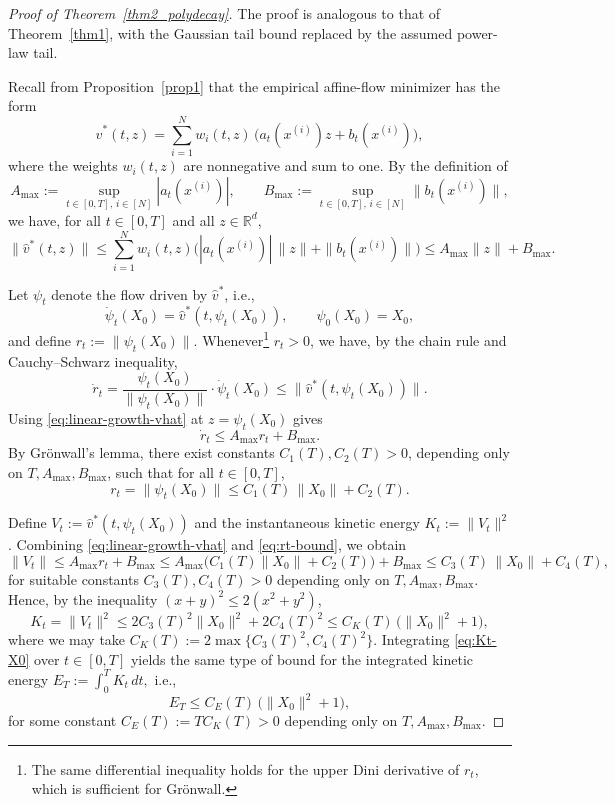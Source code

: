 \documentclass[a4paper,11pt]{article}
\theoremstyle{plain}
\theoremstyle{definition}
\begin{document}
\begin{proof}[Proof of Theorem~\ref{thm2_polydecay}]
The proof is analogous to that of Theorem~\ref{thm1}, with the Gaussian
tail bound replaced by the assumed power-law tail.

Recall from Proposition~\ref{prop1} that the empirical affine-flow minimizer
has the form
\[
\hat v^\ast(t,z)
= \sum_{i=1}^N w_i(t,z)\,\big(a_t(x^{(i)}) z + b_t(x^{(i)})\big),
\]
where the weights \(w_i(t,z)\) are nonnegative and sum to one. By the definition of
\[
A_{\max} := \sup_{t\in[0,T],\,i\in[N]} |a_t(x^{(i)})|,
\qquad
B_{\max} := \sup_{t\in[0,T],\,i\in[N]} \|b_t(x^{(i)})\|,
\]
we have, for all \(t \in [0,T]\) and all \(z \in \mathbb{R}^d\),
\begin{equation}
\label{eq:linear-growth-vhat}
\|\hat v^\ast(t,z)\|
\le \sum_{i=1}^N w_i(t,z)\big(|a_t(x^{(i)})|\,\|z\| + \|b_t(x^{(i)})\|\big)
\le A_{\max}\|z\| + B_{\max}.
\end{equation}

Let \(\psi_t\) denote the flow driven by \(\hat v^\ast\), i.e.,
\[
\dot\psi_t(X_0) = \hat v^\ast(t,\psi_t(X_0)), 
\qquad \psi_0(X_0) = X_0,
\]
and define \(r_t := \|\psi_t(X_0)\|\). Whenever\footnote{The same differential inequality holds for the upper Dini derivative of \(r_t\), which is sufficient for Grönwall.} \(r_t > 0\), we have, by the chain rule and
Cauchy--Schwarz inequality,
\[
\dot r_t
= \frac{\psi_t(X_0)}{\|\psi_t(X_0)\|} \cdot \dot\psi_t(X_0)
\le \|\hat v^\ast(t,\psi_t(X_0))\|.
\]
Using \eqref{eq:linear-growth-vhat} at \(z = \psi_t(X_0)\) gives
\[
\dot r_t
\le A_{\max} r_t + B_{\max}.
\]
By Grönwall’s lemma, there exist constants \(C_1(T), C_2(T) > 0\), depending only on
\(T, A_{\max}, B_{\max}\), such that for all \(t \in [0,T]\),
\begin{equation}
\label{eq:rt-bound}
r_t = \|\psi_t(X_0)\|
\le C_1(T)\,\|X_0\| + C_2(T).
\end{equation}

Define \(V_t := \hat v^\ast(t,\psi_t(X_0))\) and the instantaneous kinetic energy
\(K_t := \|V_t\|^2\). Combining \eqref{eq:linear-growth-vhat} and \eqref{eq:rt-bound},
we obtain
\[
\|V_t\|
\le A_{\max} r_t + B_{\max}
\le A_{\max}\big(C_1(T)\|X_0\| + C_2(T)\big) + B_{\max}
\le C_3(T)\,\|X_0\| + C_4(T),
\]
for suitable constants \(C_3(T), C_4(T) > 0\) depending only on \(T, A_{\max}, B_{\max}\).
Hence, by the inequality \((x+y)^2 \le 2(x^2 + y^2)\),
\begin{equation}
\label{eq:Kt-X0}
K_t
= \|V_t\|^2
\le 2C_3(T)^2\|X_0\|^2 + 2C_4(T)^2
\le C_K(T)\,\big(\|X_0\|^2 + 1\big),
\end{equation}
where we may take \(C_K(T) := 2\max\{C_3(T)^2, C_4(T)^2\}\).
Integrating \eqref{eq:Kt-X0} over \(t \in [0,T]\) yields the same type of bound
for the integrated kinetic energy
$E_T := \int_0^T K_t\,dt,$
i.e.,
\begin{equation}
\label{eq:ET-X0}
E_T
\le C_E(T)\,\big(\|X_0\|^2 + 1\big),
\end{equation}
for some constant \(C_E(T) := T C_K(T) > 0\) depending only on \(T, A_{\max}, B_{\max}\).


\end{proof}
\end{document}
